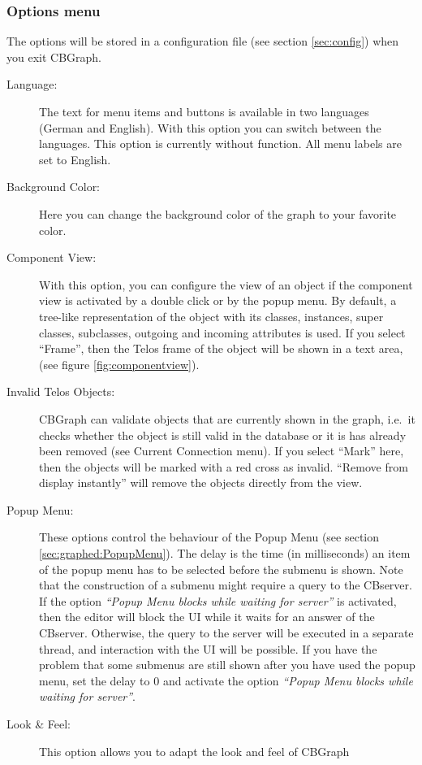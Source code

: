 \subsubsection{Options menu}
\label{sec:optionsmenu}

The options will be stored in a configuration file (see section \ref{sec:config})
when you exit CBGraph.
\begin{description}
\item[Language:] The text for menu items and buttons is available
in two languages (German and English). With this option you can switch
between the languages. This option is currently without function. All
menu labels are set to English.
\item[Background Color:] Here you can change the background color of
the graph to your favorite color.
\item[Component View:] With this option, you can configure the view
of an object if the component view is activated by a double click or
by the popup menu. By default, a tree-like representation of the
object with its classes, instances, super classes, subclasses, outgoing
and incoming attributes is used. If you select ``Frame'', then the
Telos frame of the object will be shown in a text area, (see figure \ref{fig:componentview}).
\item[Invalid Telos Objects:] CBGraph can validate objects
that are currently shown in the graph, i.e.\ it checks whether the object
is still valid in the database or it is has already been removed (see Current
Connection menu). If you select ``Mark'' here, then the objects will be marked
with a red cross as invalid. ``Remove from display instantly'' will remove
the objects directly from the view.
\item[Popup Menu:] These options control the behaviour of the Popup Menu
(see section \ref{sec:graphed:PopupMenu}). The delay is the time (in milliseconds)
an item of the popup menu has to be selected before the submenu is shown. Note that 
the construction of a submenu might require a query to the CBserver.
If the option {\em ``Popup Menu blocks while waiting for server''} is activated, then
the editor will block the UI while it waits for an answer of the CBserver.
Otherwise, the query to the server will be executed in a separate thread, and
interaction with the UI will be possible. If you have the problem that some
submenus are still shown after you have used the popup menu, set the delay to
0 and activate the option {\em ``Popup Menu blocks while waiting for server''}.
\item[Look \& Feel:] This option allows you to adapt the look and feel of CBGraph

\end{description}
